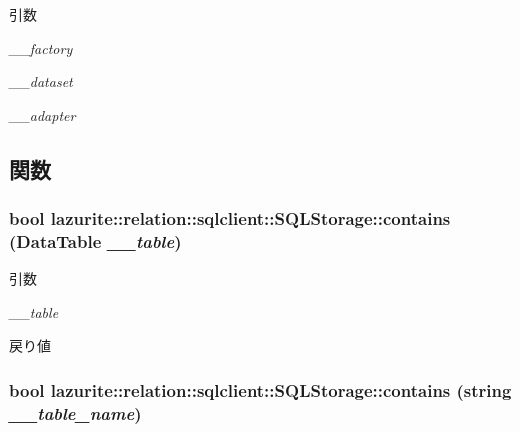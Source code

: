 \begin{DoxyParams}{引数}
\item[{\em \_\-\_\-factory}]\item[{\em \_\-\_\-dataset}]\item[{\em \_\-\_\-adapter}]\end{DoxyParams}


\subsection{関数}
\hypertarget{classlazurite_1_1relation_1_1sqlclient_1_1_s_q_l_storage_a6e19d27b72776440160c0cc3a5b17795}{
\subsubsection[{contains}]{\setlength{\rightskip}{0pt plus 5cm}bool lazurite::relation::sqlclient::SQLStorage::contains (DataTable {\em \_\-\_\-table})}}
\label{classlazurite_1_1relation_1_1sqlclient_1_1_s_q_l_storage_a6e19d27b72776440160c0cc3a5b17795}

\begin{DoxyParams}{引数}
\item[{\em \_\-\_\-table}]\end{DoxyParams}
\begin{DoxyReturn}{戻り値}

\end{DoxyReturn}
\hypertarget{classlazurite_1_1relation_1_1sqlclient_1_1_s_q_l_storage_a57c78a427b2cb14056772f1239d3b45c}{
\subsubsection[{contains}]{\setlength{\rightskip}{0pt plus 5cm}bool lazurite::relation::sqlclient::SQLStorage::contains (string {\em \_\-\_\-table\_\-name})}}
\label{classlazurite_1_1relation_1_1sqlclient_1_1_s_q_l_storage_a57c78a427b2cb14056772f1239d3b45c}

